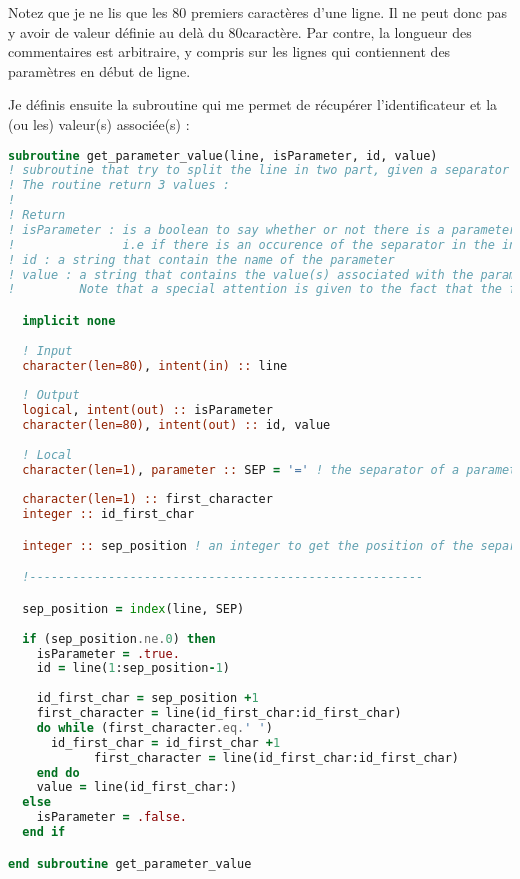 \begin{attention}
Notez que je ne lis que les 80 premiers caractères d'une ligne. Il ne peut donc pas y avoir de valeur définie au delà du 80\ieme caractère. Par contre, la longueur des commentaires est arbitraire, y compris sur les lignes qui contiennent des paramètres en début de ligne.
\end{attention}


Je définis ensuite la subroutine qui me permet de récupérer l'identificateur et la (ou les) valeur(s) associée(s) : 
\begin{lstlisting}[language=Fortran]
subroutine get_parameter_value(line, isParameter, id, value)
! subroutine that try to split the line in two part, given a separator value (set in parameter of the subroutine)
! The routine return 3 values : 
!
! Return
! isParameter : is a boolean to say whether or not there is a parameter on this line. 
!               i.e if there is an occurence of the separator in the input line
! id : a string that contain the name of the parameter
! value : a string that contains the value(s) associated with the parameter name. 
!         Note that a special attention is given to the fact that the first character of 'value' must NOT be a 'space'

  implicit none
  
  ! Input
  character(len=80), intent(in) :: line
  
  ! Output
  logical, intent(out) :: isParameter
  character(len=80), intent(out) :: id, value
  
  ! Local
  character(len=1), parameter :: SEP = '=' ! the separator of a parameter line
  
  character(len=1) :: first_character
  integer :: id_first_char

  integer :: sep_position ! an integer to get the position of the separator

  !-------------------------------------------------------

  sep_position = index(line, SEP)
  
  if (sep_position.ne.0) then
    isParameter = .true.
    id = line(1:sep_position-1)
    
    id_first_char = sep_position +1
    first_character = line(id_first_char:id_first_char)
    do while (first_character.eq.' ')
      id_first_char = id_first_char +1
			first_character = line(id_first_char:id_first_char)
    end do
    value = line(id_first_char:)
  else
    isParameter = .false.
  end if

end subroutine get_parameter_value
\end{lstlisting}


